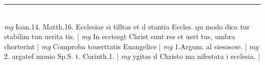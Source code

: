 \documentclass{article}
\begin{document}
\begin{pages}
\vspace{0.5cm}\noindent
\vspace{0.2cm}\rule{1cm}{0.2pt}\\ 
\hspace{0.2cm}\textit{mg}
\footnotesize Ioan.14. Matth.16. Ecclesiae si tilltas et d stantia Eccles. qu modo dica tur stabilim tun uerita tis. 
\normalsize| 
\hspace{0.2cm}\textit{mg}
\footnotesize In ecctesgt Christ sunt res et uert tus, umbra chorterint 
\normalsize| 
\hspace{0.2cm}\textit{mg}
\footnotesize Comproba touerttatis Euangelice 
\normalsize| 
\hspace{0.2cm}\textit{mg}
\footnotesize 1.Argum. al siesoscse. 
\normalsize| 
\hspace{0.2cm}\textit{mg}
\footnotesize 2. argatef monio Sp.S. t. Corinth.1. 
\normalsize| 
\hspace{0.2cm}\textit{mg}
\footnotesize ygitas d Christo ma nifestata i ecclesia. 
\normalsize| 

\end{pages}
\end{document}
